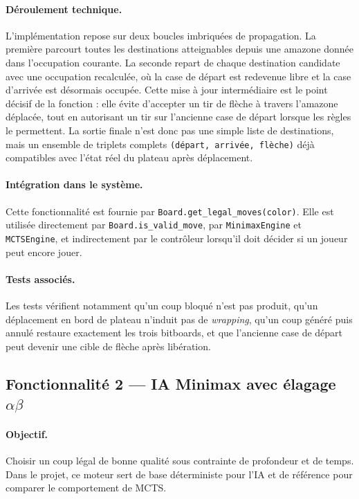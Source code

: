 \documentclass[a4paper]{article}
\begin{document}
\paragraph{Déroulement technique.}
L'implémentation repose sur deux boucles imbriquées de propagation. La première parcourt toutes les destinations atteignables depuis une amazone donnée dans l'occupation courante. La seconde repart de chaque destination candidate avec une occupation recalculée, où la case de départ est redevenue libre et la case d'arrivée est désormais occupée. Cette mise à jour intermédiaire est le point décisif de la fonction : elle évite d'accepter un tir de flèche à travers l'amazone déplacée, tout en autorisant un tir sur l'ancienne case de départ lorsque les règles le permettent. La sortie finale n'est donc pas une simple liste de destinations, mais un ensemble de triplets complets \texttt{(départ, arrivée, flèche)} déjà compatibles avec l'état réel du plateau après déplacement.

\paragraph{Intégration dans le système.}
Cette fonctionnalité est fournie par \texttt{Board.get\_legal\_moves(color)}. Elle est utilisée directement par \texttt{Board.is\_valid\_move}, par \texttt{MinimaxEngine} et \texttt{MCTSEngine}, et indirectement par le contrôleur lorsqu'il doit décider si un joueur peut encore jouer.

\paragraph{Tests associés.}
Les tests vérifient notamment qu'un coup bloqué n'est pas produit, qu'un déplacement en bord de plateau n'induit pas de \textit{wrapping}, qu'un coup généré puis annulé restaure exactement les trois bitboards, et que l'ancienne case de départ peut devenir une cible de flèche après libération.

\subsection{Fonctionnalité 2 --- IA Minimax avec élagage \texorpdfstring{$\alpha\beta$}{alpha-beta}}

\paragraph{Objectif.}
Choisir un coup légal de bonne qualité sous contrainte de profondeur et de temps. Dans le projet, ce moteur sert de base déterministe pour l'IA et de référence pour comparer le comportement de MCTS.
\end{document}
